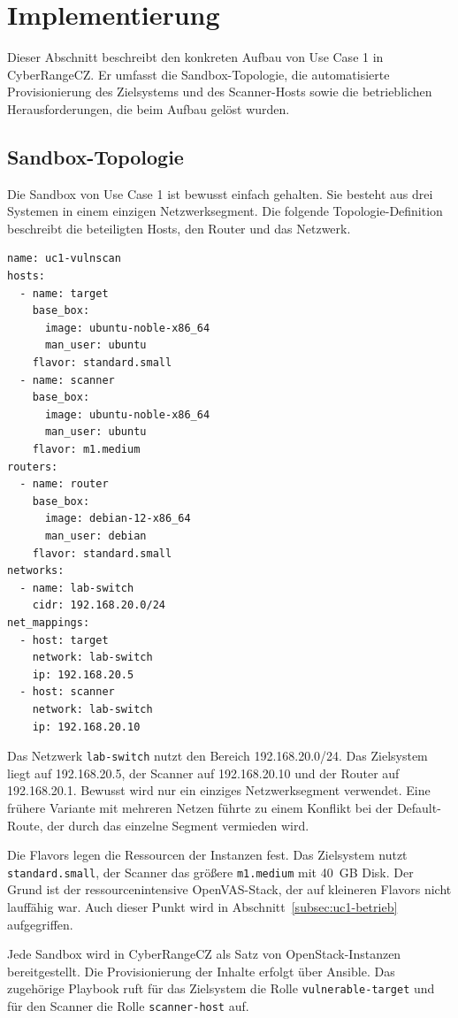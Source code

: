 \section{Implementierung}
\label{sec:uc1-implementierung}

Dieser Abschnitt beschreibt den konkreten Aufbau von Use Case 1 in CyberRangeCZ. Er umfasst die
Sandbox-Topologie, die automatisierte Provisionierung des Zielsystems und des Scanner-Hosts sowie
die betrieblichen Herausforderungen, die beim Aufbau gelöst wurden.

\subsection{Sandbox-Topologie}
\label{subsec:uc1-topologie}

Die Sandbox von Use Case 1 ist bewusst einfach gehalten. Sie besteht aus drei Systemen in einem
einzigen Netzwerksegment. Die folgende Topologie-Definition beschreibt die beteiligten Hosts, den
Router und das Netzwerk.

\begin{verbatim}
name: uc1-vulnscan
hosts:
  - name: target
    base_box:
      image: ubuntu-noble-x86_64
      man_user: ubuntu
    flavor: standard.small
  - name: scanner
    base_box:
      image: ubuntu-noble-x86_64
      man_user: ubuntu
    flavor: m1.medium
routers:
  - name: router
    base_box:
      image: debian-12-x86_64
      man_user: debian
    flavor: standard.small
networks:
  - name: lab-switch
    cidr: 192.168.20.0/24
net_mappings:
  - host: target
    network: lab-switch
    ip: 192.168.20.5
  - host: scanner
    network: lab-switch
    ip: 192.168.20.10
\end{verbatim}

Das Netzwerk \texttt{lab-switch} nutzt den Bereich 192.168.20.0/24. Das Zielsystem liegt auf
192.168.20.5, der Scanner auf 192.168.20.10 und der Router auf 192.168.20.1. Bewusst wird nur ein
einziges Netzwerksegment verwendet. Eine frühere Variante mit mehreren Netzen führte zu einem
Konflikt bei der Default-Route, der durch das einzelne Segment vermieden wird.

Die Flavors legen die Ressourcen der Instanzen fest. Das Zielsystem nutzt \texttt{standard.small},
der Scanner das größere \texttt{m1.medium} mit 40~GB Disk. Der Grund ist der ressourcenintensive
OpenVAS-Stack, der auf kleineren Flavors nicht lauffähig war. Auch dieser Punkt wird in
Abschnitt~\ref{subsec:uc1-betrieb} aufgegriffen.

Jede Sandbox wird in CyberRangeCZ als Satz von OpenStack-Instanzen bereitgestellt. Die
Provisionierung der Inhalte erfolgt über Ansible. Das zugehörige Playbook ruft für das Zielsystem
die Rolle \texttt{vulnerable-target} und für den Scanner die Rolle \texttt{scanner-host} auf.

